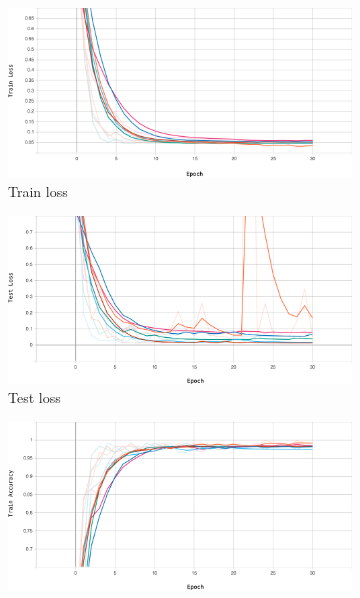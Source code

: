 \begin{figure}[htbp]
    \begin{subfigure}{0.49\textwidth}
    	\centering
        \includegraphics[width=\textwidth]{analysis/bhh_case_study/iris/train_loss.png}
        \caption{Train loss}
        \label{fig:results:case_study:iris:train:loss}
    \end{subfigure}
    \begin{subfigure}{0.49\textwidth}
    	\centering
        \includegraphics[width=\textwidth]{analysis/bhh_case_study/iris/test_loss.png}
        \caption{Test loss}
        \label{fig:results:case_study:iris:test:loss}
    \end{subfigure}
    \par\bigskip
    \begin{subfigure}{0.49\textwidth}
    	\centering
        \includegraphics[width=\textwidth]{analysis/bhh_case_study/iris/train_accuracy.png}

\end{subfigure}
\end{figure}
